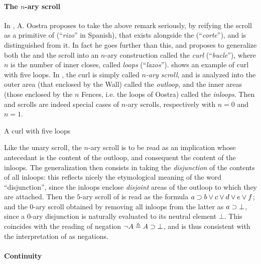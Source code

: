 \begin{scope}
\paragraph{The $n$-ary scroll}

In \cite{oostra_graficos_2010}, A. Oostra proposes to take the above remark
seriously, by reifying the scroll as a primitive  of  (``\emph{rizo}'' in
Spanish), that exists alongside the  (``\emph{corte}''), and is distinguished
from it. In fact he goes further than this, and proposes to generalize both the
 and the scroll into an $n$-ary construction called the \emph{curl}
(``\emph{bucle}''), where $n$ is the number of inner closes, called \emph{loops}
(``\emph{lazos}'').  shows an example of curl with five
loops. In \cite{minghui_graphical_2019}, the curl is simply called \emph{$n$-ary
scroll}, and is analyzed into the outer area (that enclosed by the Wall) called
the \emph{outloop}, and the inner areas (those enclosed by the $n$ Fences, i.e.
the loops of Oostra) called the \emph{inloops}. Then  and scrolls are indeed
special cases of $n$-ary scrolls, respectively with $n = 0$ and $n = 1$.

\begin{marginfigure}
  \caption{A curl with five loops}
\end{marginfigure}

Like the unary scroll, the $n$-ary scroll is to be read as an implication whose
antecedant is the content of the outloop, and consequent the content of the
inloops. The generalization then consists in taking the \emph{disjunction} of
the contents of all inloops: this reflects nicely the etymological meaning of
the word ``disjunction'', since the inloops enclose \emph{disjoint} areas of the
outloop to which they are attached. Then the $5$-ary scroll of
 is read as the formula $a \supset b \lor c \lor d \lor e \lor
f$; and the $0$-ary scroll obtained by removing all inloops from the latter as
$a \supset \bot$, since a $0$-ary disjunction is naturally evaluated to its
neutral element $\bot$. This coincides with the  reading of
negation $\neg A \triangleq A \supset \bot$, and is thus consistent with the
interpretation of  as negations.

\paragraph{Continuity}


\end{scope}
